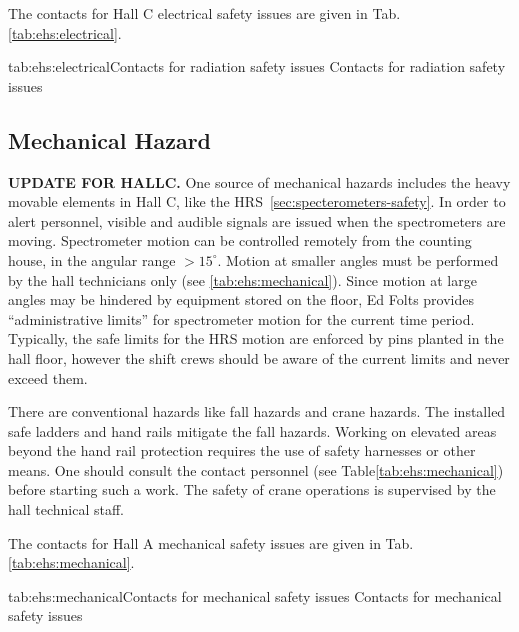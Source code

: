  The contacts for Hall C electrical safety issues are given in Tab.\ref{tab:ehs:electrical}.
 
 \begin{namestab}{tab:ehs:electrical}{Contacts for radiation safety issues}{%
   Contacts for radiation safety issues}
 \end{namestab}

 
\begin{safetyen}{0}{0}
\section{Mechanical Hazard} 
\label{sec:mechhazard}
\end{safetyen}

\textbf{UPDATE FOR HALLC.}
One source of mechanical hazards includes the heavy movable 
 elements in Hall C, like the HRS~\ref{sec:specterometers-safety}.
 In order to alert personnel, visible and audible signals are issued when
 the spectrometers
 are moving.   
 Spectrometer motion can be controlled remotely from the counting house,
 in the angular range $>15^\circ$. Motion at smaller angles
 must be performed by the hall technicians only (see \ref{tab:ehs:mechanical}).
 Since motion at large angles may be hindered by equipment stored on the floor,
 Ed Folts provides ``administrative limits'' for spectrometer motion for
 the current time period. Typically, the safe limits for the HRS motion 
 are enforced by pins planted in the hall floor, however the shift crews should
 be aware of the current limits and never exceed them.

 There are conventional
 hazards like fall hazards and crane hazards. The installed safe ladders and hand rails
 mitigate the fall hazards. Working on elevated areas beyond the hand rail protection
 requires the use of safety harnesses or other means. One should consult the contact
 personnel (see Table\ref{tab:ehs:mechanical}) before starting such a work.
 The safety of crane operations is supervised by the hall technical staff. 

 The contacts for Hall A mechanical safety issues are given in Tab.\ref{tab:ehs:mechanical}.
 
 \begin{namestab}{tab:ehs:mechanical}{Contacts for mechanical safety issues}{%
   Contacts for mechanical safety issues}
 \end{namestab}

